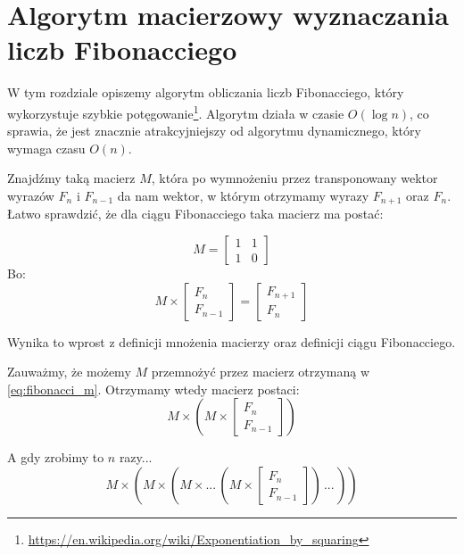 \section{Algorytm macierzowy wyznaczania liczb Fibonacciego}

W tym rozdziale opiszemy algorytm obliczania liczb Fibonacciego, który wykorzystuje szybkie 
potęgowanie\footnote{\url{https://en.wikipedia.org/wiki/Exponentiation_by_squaring}}. 
Algorytm działa w czasie $O(\log{n})$, co sprawia, że jest znacznie atrakcyjniejszy od algorytmu 
dynamicznego, który wymaga czasu $O(n)$.

Znajdźmy taką macierz $M$, która po wymnożeniu przez transponowany wektor wyrazów 
$F_{n}$ i $F_{n - 1}$ da nam wektor, w którym otrzymamy wyrazy $F_{n + 1}$ oraz $F_{n}$. 
Łatwo sprawdzić, że dla ciągu Fibonacciego taka macierz ma postać:


\begin{equation}
	M = \begin{bmatrix}1 & 1\\1 & 0\end{bmatrix}
\end{equation}
Bo:
\begin{equation}
\label{eq:fibonacci_m}
	M \times
	\begin{bmatrix}F_n \\ F_{n - 1}\end{bmatrix}
	= \begin{bmatrix}F_{n + 1} \\ F_{n}\end{bmatrix}
\end{equation}

Wynika to wprost z definicji mnożenia macierzy oraz definicji ciągu Fibonacciego.


\begin{observation}{Zauważmy, że możemy $M$ przemnożyć przez macierz otrzymaną w \ref{eq:fibonacci_m}. Otrzymamy wtedy macierz postaci:}
\begin{equation}
	M \times (M \times \begin{bmatrix}F_n \\ F_{n - 1}\end{bmatrix})
\end{equation}
\end{observation}

\begin{observation}{A gdy zrobimy to $n$ razy...}
\label{mnozenie_n_razy}
\begin{equation}
	M \times (M \times (M \times ...\, (M \times \begin{bmatrix}F_n \\ F_{n - 1}\end{bmatrix})\,...\,))
\end{equation}
\end{observation}

